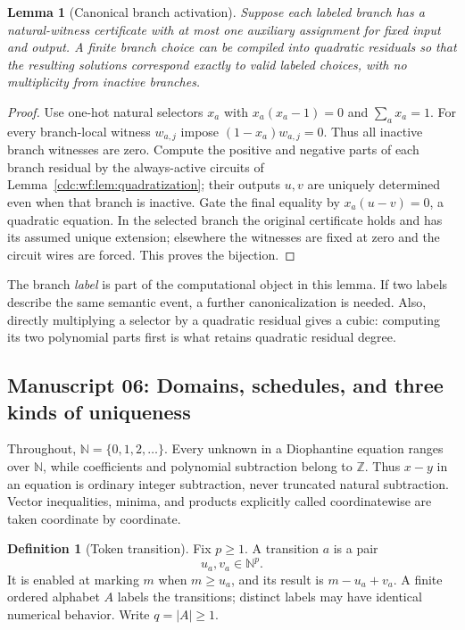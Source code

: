 \documentclass[11pt,a4paper]{article}
\newtheorem{lemma}[lemma]{Lemma}
\theoremstyle{definition}
\newtheorem{definition}[definition]{Definition}
\theoremstyle{remark}
\newcommand{\N}{\mathbb N}
\newcommand{\Z}{\mathbb Z}
\begin{document}
\begin{lemma}[Canonical branch activation]\label{cdc:wf:lem:activation}
Suppose each labeled branch has a natural-witness certificate with at most one auxiliary assignment for fixed input and output. A finite branch choice can be compiled into quadratic residuals so that the resulting solutions correspond exactly to valid labeled choices, with no multiplicity from inactive branches.
\end{lemma}
\begin{proof}
Use one-hot natural selectors $x_a$ with $x_a(x_a-1)=0$ and $\sum_a x_a=1$. For every branch-local witness $w_{a,j}$ impose $(1-x_a)w_{a,j}=0$. Thus all inactive branch witnesses are zero. Compute the positive and negative parts of each branch residual by the always-active circuits of Lemma~\ref{cdc:wf:lem:quadratization}; their outputs $u,v$ are uniquely determined even when that branch is inactive. Gate the final equality by $x_a(u-v)=0$, a quadratic equation. In the selected branch the original certificate holds and has its assumed unique extension; elsewhere the witnesses are fixed at zero and the circuit wires are forced. This proves the bijection.
\end{proof}

The branch \emph{label} is part of the computational object in this lemma. If two labels describe the same semantic event, a further canonicalization is needed. Also, directly multiplying a selector by a quadratic residual gives a cubic: computing its two polynomial parts first is what retains quadratic residual degree.


\subsection{Manuscript 06: Domains, schedules, and three kinds of uniqueness}
\label{cdc:cs:sec:definitions}

Throughout, $\N=\{0,1,2,\ldots\}$. Every unknown in a Diophantine equation ranges
over $\N$, while coefficients and polynomial subtraction belong to $\Z$.
Thus $x-y$ in an equation is ordinary integer subtraction, never truncated
natural subtraction. Vector inequalities, minima, and products explicitly
called coordinatewise are taken coordinate by coordinate.

\begin{definition}[Token transition]
Fix $p\geq1$. A transition $a$ is a pair
\[
u_a,v_a\in\N^p.
\]
It is enabled at marking $m$ when $m\geq u_a$, and its result is
$m-u_a+v_a$. A finite ordered alphabet $A$ labels the transitions; distinct
labels may have identical numerical behavior. Write $q=|A|\geq1$.
\end{definition}
\end{document}
